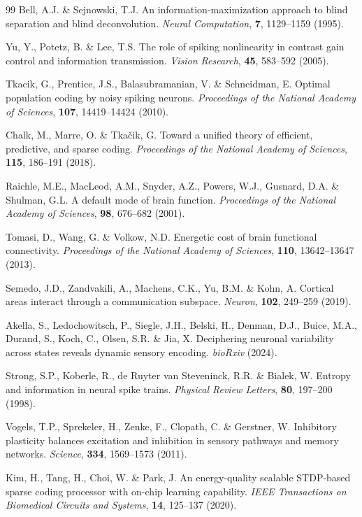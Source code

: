 \begin{thebibliography}{99}
 Bell, A.J. \& Sejnowski, T.J. An information-maximization approach to blind separation and blind deconvolution. \emph{Neural Computation}, \textbf{7}, 1129--1159 (1995).

 Yu, Y., Potetz, B. \& Lee, T.S. The role of spiking nonlinearity in contrast gain control and information transmission. \emph{Vision Research}, \textbf{45}, 583--592 (2005).

 Tkacik, G., Prentice, J.S., Balasubramanian, V. \& Schneidman, E. Optimal population coding by noisy spiking neurons. \emph{Proceedings of the National Academy of Sciences}, \textbf{107}, 14419--14424 (2010).

 Chalk, M., Marre, O. \& Tka{\v{c}}ik, G. Toward a unified theory of efficient, predictive, and sparse coding. \emph{Proceedings of the National Academy of Sciences}, \textbf{115}, 186--191 (2018).

 Raichle, M.E., MacLeod, A.M., Snyder, A.Z., Powers, W.J., Gusnard, D.A. \& Shulman, G.L. A default mode of brain function. \emph{Proceedings of the National Academy of Sciences}, \textbf{98}, 676--682 (2001).

 Tomasi, D., Wang, G. \& Volkow, N.D. Energetic cost of brain functional connectivity. \emph{Proceedings of the National Academy of Sciences}, \textbf{110}, 13642--13647 (2013).

 Semedo, J.D., Zandvakili, A., Machens, C.K., Yu, B.M. \& Kohn, A. Cortical areas interact through a communication subspace. \emph{Neuron}, \textbf{102}, 249--259 (2019).

 Akella, S., Ledochowitsch, P., Siegle, J.H., Belski, H., Denman, D.J., Buice, M.A., Durand, S., Koch, C., Olsen, S.R. \& Jia, X. Deciphering neuronal variability across states reveals dynamic sensory encoding. \emph{bioRxiv} (2024).

 Strong, S.P., Koberle, R., de Ruyter van Steveninck, R.R. \& Bialek, W. Entropy and information in neural spike trains. \emph{Physical Review Letters}, \textbf{80}, 197--200 (1998).

 Vogels, T.P., Sprekeler, H., Zenke, F., Clopath, C. \& Gerstner, W. Inhibitory plasticity balances excitation and inhibition in sensory pathways and memory networks. \emph{Science}, \textbf{334}, 1569--1573 (2011).

 Kim, H., Tang, H., Choi, W. \& Park, J. An energy-quality scalable STDP-based sparse coding processor with on-chip learning capability. \emph{IEEE Transactions on Biomedical Circuits and Systems}, \textbf{14}, 125--137 (2020).


\end{thebibliography}
